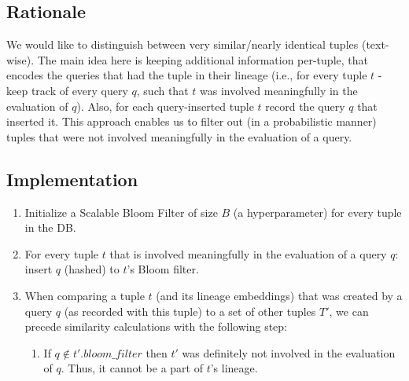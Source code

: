 \subsection{Rationale} We would like to distinguish between very similar/nearly identical tuples (text-wise). The main idea here is keeping additional information per-tuple, that encodes the queries that had the tuple in their lineage (i.e., for every tuple $t$ - keep track of every query $q$, such that $t$ was involved meaningfully in the evaluation of $q$). Also, for each query-inserted tuple $t$ record the query $q$ that inserted it. This approach enables us to filter out (in a probabilistic manner) tuples that were not involved meaningfully in the evaluation of a query.\\

\subsection{Implementation}  
\begin{enumerate}
    \item Initialize a Scalable Bloom Filter \cite{scalable-bloom-filters} of size $B$ (a hyperparameter) for every tuple in the DB.
    \item For every tuple $t$ that is involved meaningfully in the evaluation of a query $q$: insert $q$ (hashed) to $t$'s Bloom filter.
    \item When comparing a tuple $t$ (and its lineage embeddings) that was created by a query $q$ (as recorded with this tuple) to a set of other tuples $T'$, we can precede similarity calculations with the following step:
    \begin{enumerate}
        \item If $q \notin t'.bloom\_filter$ then $t'$ was definitely not involved in the evaluation of $q$. Thus, it cannot be a part of $t$'s lineage.
    \end{enumerate}
\end{enumerate}

